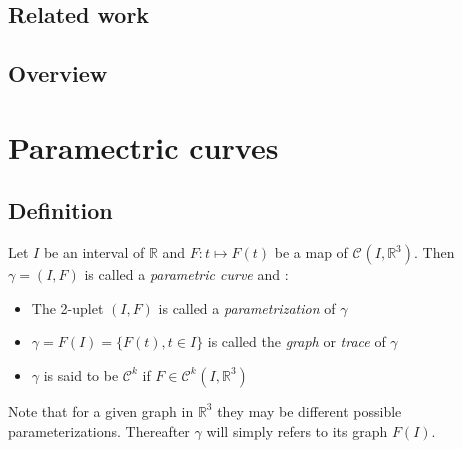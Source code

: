 \subsection{Related work}

\citet{Bishop1975}
\citep{Bishop1975}
\citeauthor{Bishop1975}
\citeyear{Bishop1975}

\cite{Bishop1975}
\cite{Bergou2008}
\cite{Hoffmann2008}
\cite{Bluth2014}
\cite{Frenet1852}
\cite{Delcourt2007}
\cite{Farouki2014}
\cite{Guggenheimer1989}
\cite{Klok1986}

\subsection{Overview}



\section{Paramectric curves}

\subsection{Definition}
Let $I$ be an interval of $\mathbb{R}$ and $F\colon t \mapsto F(t)$ be a map of ${\mathcal{C}}^{}(I,{\mathbb{R}}^3)$. Then $\gamma=(I,F)$ is called a \emph{parametric curve} and :
\begin{itemize}
	\item The 2-uplet $(I,F)$ is called a \emph{parametrization} of $\gamma$
	\item $\gamma = F(I) = \{F(t), t \in I\}$ is called the \emph{graph} or \emph{trace} of $\gamma$
	\item $\gamma$ is said to be ${\mathcal{C}}^{k}$ if $F \in {\mathcal{C}^{k}}^{}(I,{\mathbb{R}}^3)$
\end{itemize}
Note that for a given graph in ${\mathbb{R}}^3$ they may be different possible parameterizations. Thereafter $\gamma$ will simply refers to its graph $F(I)$. 

